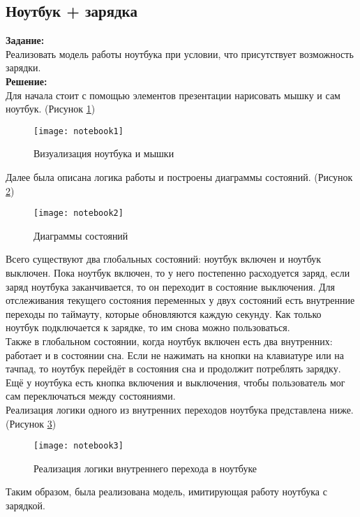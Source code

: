 \subsection*{Ноутбук + зарядка}

\textbf{Задание:}\\
Реализовать модель работы ноутбука при условии, что присутствует возможность зарядки.\\

\textbf{Решение:}\\
Для начала стоит с помощью элементов презентации нарисовать мышку и сам ноутбук. (Рисунок \ref{fig:notebook1})
\begin{figure}[h]
	\centering \texttt{[image: notebook1]}
	\caption{Визуализация ноутбука и мышки}
	\label{fig:notebook1}
\end{figure}

Далее была описана логика работы и построены диаграммы состояний. (Рисунок \ref{fig:notebook2})
\begin{figure}[h]
	\centering \texttt{[image: notebook2]}
	\caption{Диаграммы состояний}
	\label{fig:notebook2}
\end{figure}

Всего существуют два глобальных состояний: ноутбук включен и ноутбук выключен. Пока ноутбук включен, то у него постепенно расходуется заряд, если заряд ноутбука заканчивается, то он переходит в состояние выключения. Для отслеживания текущего состояния переменных у двух состояний есть внутренние переходы по таймауту, которые обновляются каждую секунду. Как только ноутбук подключается к зарядке, то им снова можно пользоваться.\\

Также в глобальном состоянии, когда ноутбук включен есть два внутренних: работает и в состоянии сна. Если не нажимать на кнопки на клавиатуре или на тачпад, то ноутбук перейдёт в состояния сна и продолжит потреблять зарядку.\\

Ещё у ноутбука есть кнопка включения и выключения, чтобы пользователь мог сам переключаться между состояниями.\\

Реализация логики одного из внутренних переходов ноутбука представлена ниже. (Рисунок \ref{fig:notebook3})
\begin{figure}[h]
	\centering \texttt{[image: notebook3]}
	\caption{Реализация логики внутреннего перехода в ноутбуке}
	\label{fig:notebook3}
\end{figure}

Таким образом, была реализована модель, имитирующая работу ноутбука с зарядкой.\\
